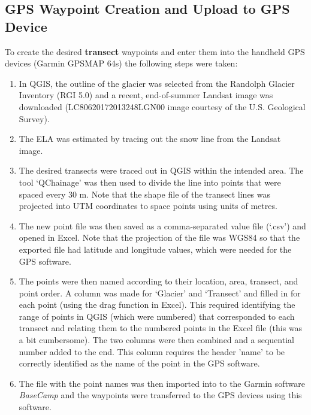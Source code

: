 \documentclass{sfuthesis}
\begin{document}
%
%
%
%
%

\backmatter%
	
	

\begin{appendices} 

	\chapter{GPS Waypoint Creation and Upload to GPS Device}
	
	To create the desired \textbf{transect} waypoints and enter them into the handheld GPS devices (Garmin GPSMAP 64s) the following steps were taken:
\begin{enumerate}
\item In QGIS, the outline of the glacier was selected from the Randolph Glacier Inventory (RGI 5.0) \citep{Pfeffer2014} and a recent, end-of-summer Landsat image was downloaded (LC80620172013248LGN00 image courtesy of the U.S. Geological Survey). 
\item The ELA was estimated by tracing out the snow line from the Landsat image.
\item The desired transects were traced out in QGIS within the intended area. The tool `QChainage' was then used to divide the line into points that were spaced every 30 m. Note that the shape file of the transect lines was projected into UTM coordinates to space points using units of metres. 
\item The new point file was then saved as a comma-separated value file (`.csv') and opened in Excel. Note that the projection of the file was WGS84 so that the exported file had latitude and longitude values, which were needed for the GPS software.
\item The points were then named according to their location, area, transect, and point order. A column was made for `Glacier' and `Transect' and filled in for each point (using the drag function in Excel). This required identifying the range of points in QGIS (which were numbered) that corresponded to each transect and relating them to the numbered points in the Excel file (this was a bit cumbersome). The two columns were then combined and a sequential number added to the end. This column requires the header 'name' to be correctly identified as the name of the point in the GPS software.
\item The file with the point names was then imported into to the Garmin software \textit{BaseCamp} and the waypoints were transferred to the GPS devices using this software. 
\end{enumerate}


\end{appendices}
\end{document}
